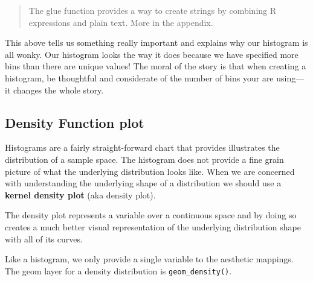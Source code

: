 \documentclass[
]{book}
\newenvironment{Shaded}{\begin{snugshade}}{\end{snugshade}}
\newcommand{\CommentTok}[1]{\textcolor[rgb]{0.56,0.35,0.01}{\textit{#1}}}
\newcommand{\KeywordTok}[1]{\textcolor[rgb]{0.13,0.29,0.53}{\textbf{#1}}}
\newcommand{\NormalTok}[1]{#1}
\newcommand{\OperatorTok}[1]{\textcolor[rgb]{0.81,0.36,0.00}{\textbf{#1}}}
\newcommand{\StringTok}[1]{\textcolor[rgb]{0.31,0.60,0.02}{#1}}
\begin{document}
\begin{Shaded}
\end{Shaded}

\begin{quote}
The glue function provides a way to create strings by combining R expressions and plain text. More in the appendix.
\end{quote}

This above tells us something really important and explains why our histogram is all wonky. Our histogram looks the way it does because we have specified more bins than there are unique values! The moral of the story is that when creating a histogram, be thoughtful and considerate of the number of bins your are using---it changes the whole story.

\hypertarget{density-function-plot}{%
\subsection{Density Function plot}\label{density-function-plot}}

Histograms are a fairly straight-forward chart that provides illustrates the distribution of a sample space. The histogram does not provide a fine grain picture of what the underlying distribution looks like. When we are concerned with understanding the underlying shape of a distribution we should use a \textbf{kernel density plot} (aka density plot).

The density plot represents a variable over a continuous space and by doing so creates a much better visual representation of the underlying distribution shape with all of its curves.

Like a histogram, we only provide a single variable to the aesthetic mappings. The geom layer for a density distribution is \texttt{geom\_density()}.
\end{document}
